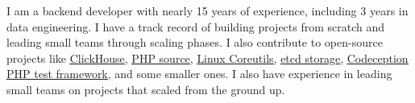 I am a backend developer with nearly 15 years of experience, including 3 years
in data engineering. I have a track record of building projects from scratch
and leading small teams through scaling phases. I also contribute to
open-source projects like
\href{https://github.com/ClickHouse/ClickHouse/pulls?q=is\%3Apr+is\%3Aclosed+author\%3AGSokol}{\underline{ClickHouse}},
\href{https://github.com/php/php-src/pulls?q=is\%3Apr+is\%3Aclosed+author\%3AGSokol}{\underline{PHP source}},
\href{https://github.com/coreutils/coreutils/commits?author=GSokol}{\underline{Linux Coreutils}},
\href{https://github.com/etcd-io/etcd/pulls?q=is\%3Apr+is\%3Aclosed+author\%3AGSokol}{\underline{etcd storage}},
\href{https://github.com/Codeception/Codeception/pulls?q=is\%3Apr+is\%3Aclosed+author\%3AGSokol}{\underline{Codeception PHP test framework}},
and some smaller ones. I also have experience in leading small teams on
projects that scaled from the ground up.
